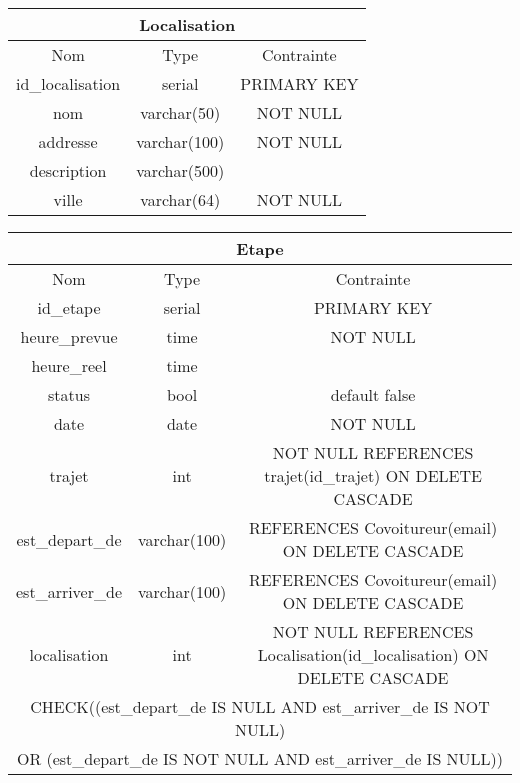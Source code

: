 \begin{center}
		\begin{tabular}{|c|c|c|}
			\hline
			\multicolumn{3}{|c|}{Localisation}\\
			\hline
			Nom & Type & Contrainte \\
			\hline
			id\_localisation & serial & PRIMARY KEY \\\hline
			nom & varchar(50) & NOT NULL \\\hline
			addresse & varchar(100) & NOT NULL \\\hline
			description & varchar(500) & \\\hline
			ville & varchar(64) & NOT NULL \\\hline
		\end{tabular}
		\begin{tabular}{|c|c|c|}
			\hline
			\multicolumn{3}{|c|}{Etape}\\
			\hline
			Nom & Type & Contrainte \\
			\hline
			id\_etape & serial & PRIMARY KEY \\\hline
			heure\_prevue & time & NOT NULL \\\hline
			heure\_reel & time &  \\\hline
			status & bool & default false \\\hline
			date & date & NOT NULL \\\hline
			trajet & int & NOT NULL REFERENCES trajet(id\_trajet) ON DELETE CASCADE \\\hline
			est\_depart\_de & varchar(100) & REFERENCES Covoitureur(email) ON DELETE CASCADE \\\hline
			est\_arriver\_de & varchar(100) & REFERENCES Covoitureur(email) ON DELETE CASCADE \\\hline
			localisation & int & NOT NULL REFERENCES Localisation(id\_localisation) ON DELETE CASCADE\\\hline
			\multicolumn{3}{|c|}{CHECK((est\_depart\_de IS NULL AND est\_arriver\_de IS NOT NULL)} \\
			\multicolumn{3}{|c|}{OR (est\_depart\_de IS NOT NULL AND est\_arriver\_de IS NULL))}\\\hline
		\end{tabular}
		
		
		

\end{center}
